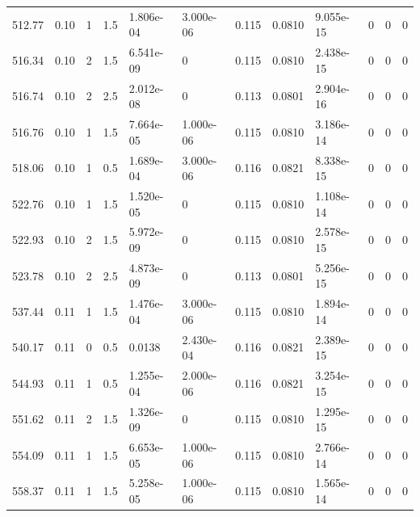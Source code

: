 \documentclass[preview]{standalone}
\begin{document}
{{{\begin{tabular}{L{1.2cm}C{1.2cm} C{0.3cm}C{0.5cm} C{1.4cm}C{1.4cm} C{1.4cm}C{1.4cm} C{1.6cm}C{1.6cm} C{1.6cm}C{1.6cm}}
  512.77  &  0.10  & 1     & 1.5 &  1.806e-04  & 3.000e-06  &  0.115&   0.0810& 9.055e-15 & 0   &  0 & 0  \\ 
  516.34  &  0.10  & 2     & 1.5 &  6.541e-09  & 0  &  0.115&   0.0810& 2.438e-15 & 0   &  0 & 0  \\ 
  516.74  &  0.10  & 2     & 2.5 &  2.012e-08  & 0  &  0.113&   0.0801& 2.904e-16 & 0   &  0 & 0  \\ 
  516.76  &  0.10  & 1     & 1.5 &  7.664e-05  & 1.000e-06  &  0.115&   0.0810& 3.186e-14 & 0   &  0 & 0  \\ 
  518.06  &  0.10  & 1     & 0.5 &  1.689e-04  & 3.000e-06  &  0.116&   0.0821& 8.338e-15 & 0   &  0 & 0  \\ 
  522.76  &  0.10  & 1     & 1.5 &  1.520e-05  & 0  &  0.115&   0.0810& 1.108e-14 & 0   &  0 & 0  \\ 
  522.93  &  0.10  & 2     & 1.5 &  5.972e-09  & 0  &  0.115&   0.0810& 2.578e-15 & 0   &  0 & 0  \\ 
  523.78  &  0.10  & 2     & 2.5 &  4.873e-09  & 0  &  0.113&   0.0801& 5.256e-15 & 0   &  0 & 0  \\ 
  537.44  &  0.11  & 1     & 1.5 &  1.476e-04  & 3.000e-06  &  0.115&   0.0810& 1.894e-14 & 0   &  0 & 0  \\ 
  540.17  &  0.11  & 0     & 0.5 &  0.0138  & 2.430e-04  &  0.116&   0.0821& 2.389e-15 & 0   &  0 & 0  \\ 
  544.93  &  0.11  & 1     & 0.5 &  1.255e-04  & 2.000e-06  &  0.116&   0.0821& 3.254e-15 & 0   &  0 & 0  \\ 
  551.62  &  0.11  & 2     & 1.5 &  1.326e-09  & 0  &  0.115&   0.0810& 1.295e-15 & 0   &  0 & 0  \\ 
  554.09  &  0.11  & 1     & 1.5 &  6.653e-05  & 1.000e-06  &  0.115&   0.0810& 2.766e-14 & 0   &  0 & 0  \\ 
  558.37  &  0.11  & 1     & 1.5 &  5.258e-05  & 1.000e-06  &  0.115&   0.0810& 1.565e-14 & 0   &  0 & 0  \\ 
\hline 
\end{tabular} 

}}}
\end{document}
